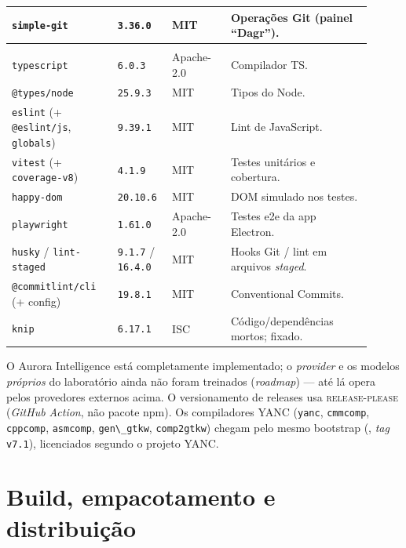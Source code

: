 \documentclass[11pt,a4paper,oneside]{article}
\newcommand{\file}[1]{\path{#1}}
\newcommand{\tool}[1]{\textsc{#1}}
\newcommand{\code}[1]{\lstinline[basicstyle=\ttfamily]|#1|}
\newenvironment{nota}
  {\par\medskip\noindent\tabularx{\linewidth}{!{\color{auroraTeal}\vrule width 3pt}>{\hspace{8pt}\small}X}}
  {\endtabularx\par\medskip}
\begin{document}
\begin{longtable}{>{\raggedright\arraybackslash}p{0.27\linewidth} >{\raggedright\arraybackslash}p{0.13\linewidth} >{\raggedright\arraybackslash}p{0.15\linewidth} >{\raggedright\arraybackslash}p{0.36\linewidth}}
\lstinline|simple-git| & \code{3.36.0} & MIT & Operações Git (painel \enquote{Dagr}). \\
\midrule
\multicolumn{4}{l}{\textit{Qualidade e desenvolvimento (devDependencies)}} \\
\midrule
\lstinline|typescript| & \code{6.0.3} & Apache-2.0 & Compilador TS. \\
\lstinline|@types/node| & \code{25.9.3} & MIT & Tipos do Node. \\
\lstinline|eslint| (+ \lstinline|@eslint/js|, \lstinline|globals|) & \code{9.39.1} & MIT & Lint de JavaScript. \\
\lstinline|vitest| (+ \lstinline|coverage-v8|) & \code{4.1.9} & MIT & Testes unitários e cobertura. \\
\lstinline|happy-dom| & \code{20.10.6} & MIT & DOM simulado nos testes. \\
\lstinline|playwright| & \code{1.61.0} & Apache-2.0 & Testes e2e da app Electron. \\
\lstinline|husky| / \lstinline|lint-staged| & \code{9.1.7} / \code{16.4.0} & MIT & Hooks Git / lint em arquivos \emph{staged}. \\
\lstinline|@commitlint/cli| (+ config) & \code{19.8.1} & MIT & Conventional Commits. \\
\lstinline|knip| & \code{6.17.1} & ISC & Código/dependências mortos; fixado. \\
\end{longtable}

\begin{nota}
O Aurora Intelligence está completamente implementado; o \emph{provider} e os
modelos \emph{próprios} do laboratório ainda não foram treinados (\emph{roadmap}) ---
até lá opera pelos provedores externos acima. O versionamento de releases usa
\tool{release-please} (\emph{GitHub Action}, não pacote npm). Os compiladores YANC
(\code{yanc}, \code{cmmcomp}, \code{cppcomp}, \code{asmcomp}, \code{gen\_gtkw},
\code{comp2gtkw}) chegam pelo mesmo bootstrap (\file{download-yanc.cts}, \emph{tag}
\code{v7.1}), licenciados segundo o projeto YANC.
\end{nota}
\section{Build, empacotamento e distribuição}
\label{sec:S13-build-distribuicao}
\end{document}
